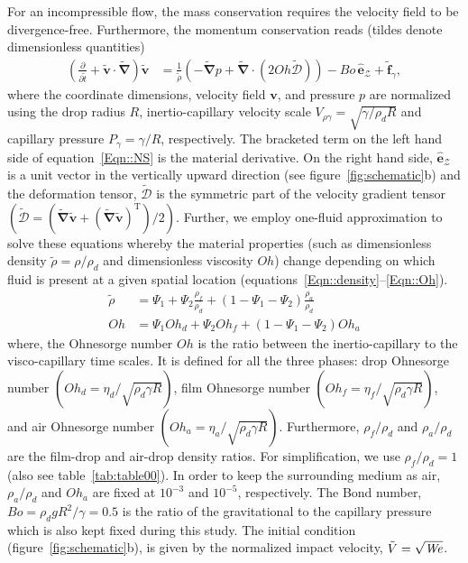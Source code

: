 For an incompressible flow, the mass conservation requires the velocity field to be divergence-free.  Furthermore, the momentum conservation  reads (tildes denote dimensionless quantities)
\begin{align}
	\label{Eqn::NS}
	\left(\frac{\partial}{\partial \tilde{t}} + \boldsymbol{\tilde{v}\cdot\tilde{\nabla}}\right)\boldsymbol{\tilde{v}} &= \frac{1}{\tilde{\rho}}\left(-\boldsymbol{\tilde{\nabla}} p + \boldsymbol{\tilde{\nabla}\cdot}\left(2Oh\boldsymbol{\tilde{\mathcal{D}}}\right)\right) - Bo\,\boldsymbol{\hat{e}}_{\boldsymbol{\mathcal{Z}}} + \boldsymbol{\tilde{f}}_\gamma,
\end{align}
\noindent where the coordinate dimensions, velocity field $\boldsymbol{v}$, and pressure $p$ are normalized using the drop radius $R$, inertio-capillary velocity scale $V_{\rho\gamma} = \sqrt{\gamma/\rho_d R}$ and capillary pressure $P_{\gamma} = \gamma/R$, respectively. The bracketed term on the left hand side of equation~\eqref{Eqn::NS} is the material derivative. On the right hand side, $\boldsymbol{\hat{e}}_{\boldsymbol{\mathcal{Z}}}$ is a unit vector in the vertically upward direction (see figure~\ref{fig:schematic}b) and the deformation tensor, $\boldsymbol{\tilde{\mathcal{D}}}$ is the symmetric part of the velocity gradient tensor $\left(\boldsymbol{\tilde{\mathcal{D}}} = \left(\boldsymbol{\tilde{\nabla}\tilde{v}} + \left(\boldsymbol{\tilde{\nabla}\tilde{v}}\right)^{\text{T}}\right)/2\right)$. Further, we employ one-fluid approximation \citep{prosperetti2009computational, tryggvason2011direct} to solve these equations whereby the material properties (such as dimensionless density $\tilde{\rho} = \rho/\rho_d$ and dimensionless viscosity $Oh$) change depending on which fluid is present at a given spatial location (equations~\eqref{Eqn::density}--\eqref{Eqn::Oh}). 
\begin{align}
	\label{Eqn::density}
	\tilde{\rho} &= \Psi_1 + \Psi_2\frac{\rho_{f}}{\rho_{d}} + \left(1-\Psi_1-\Psi_2\right)\frac{\rho_{a}}{\rho_{d}}\\
	\label{Eqn::Oh}
	Oh &= \Psi_1Oh_d + \Psi_2Oh_f + \left(1-\Psi_1-\Psi_2\right)Oh_a
\end{align}
\noindent where, the Ohnesorge number $Oh$ is the ratio between the inertio-capillary to the visco-capillary time scales. It is defined for all the three phases: drop Ohnesorge number $\left(Oh_d = \eta_d/\sqrt{\rho_d\gamma R}\right)$, film Ohnesorge number $\left(Oh_f = \eta_f/\sqrt{\rho_d\gamma R}\right)$, and air Ohnesorge number $\left(Oh_a = \eta_a/\sqrt{\rho_d\gamma R}\right)$. Furthermore, $\rho_f/\rho_d$ and $\rho_a/\rho_d$ are the film-drop and air-drop density ratios. For simplification, we use $\rho_f/\rho_d = 1$ (also see table~\ref{tab:table00}). In order to keep the surrounding medium as air, $\rho_a/\rho_d$ and $Oh_a$ are fixed at $10^{-3}$ and $10^{-5}$, respectively. The Bond number, $Bo = \rho_dgR^2/\gamma = 0.5$ is the ratio of the gravitational to the capillary pressure which is also kept fixed during this study. The initial condition (figure~\ref{fig:schematic}b), is given by the normalized impact velocity, $\tilde{V} = \sqrt{\mathit{We}}$. 


